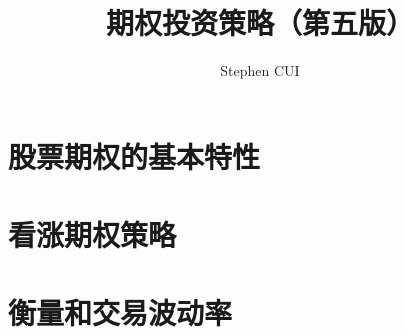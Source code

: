 \documentclass[openany]{book}
\title{期权投资策略（第五版）}
\author{Stephen CUI}
\begin{document}
\maketitle
\frontmatter
\tableofcontents
\mainmatter
\part{股票期权的基本特性}
\part{看涨期权策略}
% 

\part{}
\part{}
\part{}
\part{衡量和交易波动率}

\end{document}
